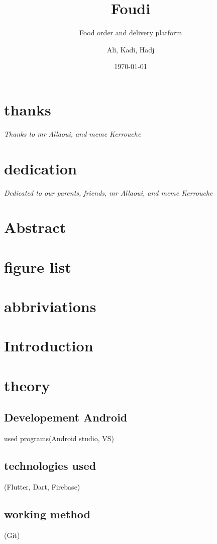\documentclass[a4paper]{report}
\title{\textbf{Foudi}}
\subtitle{Food order and delivery platform}
\author{Ali, Kadi, Hadj}
\date{\today}
\begin{document}
\maketitle

\chapter*{thanks}
\Large \emph\textit{{Thanks to mr Allaoui, and meme Kerrouche}}

\chapter*{dedication}
\Large \emph\textit{{Dedicated to our parents, friends, mr Allaoui, and meme Kerrouche}}

\newpage
\chapter*{Abstract}


\tableofcontents

\newpage
\chapter*{figure list}

\newpage
\chapter*{abbriviations}


\newpage
\chapter*{Introduction}

\newpage
\chapter{theory}
	\section{Developement Android} used programs(Android studio, VS)
	\section{technologies used} (Flutter, Dart, Firebase)
	\section{working method} (Git)
\end{document}

